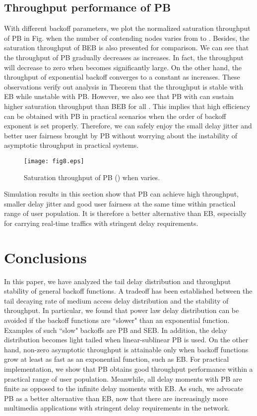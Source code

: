 \documentclass[journal]{IEEEtran}
\begin{document}
\subsection{Throughput performance of PB}
With different backoff parameters, we plot the normalized saturation throughput of PB in Fig.  when the number of contending nodes varies from  to . Besides, the saturation throughput of BEB is also presented for comparison. We can see that the throughput of PB gradually decreases as  increases. In fact, the throughput will decrease to zero when  becomes significantly large. On the other hand, the throughput of exponential backoff converges to a constant as  increases. These observations verify out analysis in Theorem  that the throughput is stable with EB while unstable with PB. However, we also see that PB with  can sustain higher saturation throughput than BEB for all . This implies that high efficiency can be obtained with PB in practical scenarios when the order of backoff exponent is set properly. Therefore, we can safely enjoy the small delay jitter and better user fairness brought by PB without worrying about the instability of asymptotic throughput in practical systems.

\begin{figure}
\centering
  \begin{center}
    \texttt{[image: fig8.eps]}
  \end{center}
  \caption{Saturation throughput of PB () when  varies.}
  \label{58}
\end{figure}

Simulation results in this section show that PB can achieve high throughput, smaller delay jitter and good user fairness at the same time within practical range of user population. It is therefore a better alternative than EB, especially for carrying real-time traffics with stringent delay requirements.

\section{Conclusions}
In this paper, we have analyzed the tail delay distribution and throughput stability of general backoff functions. A tradeoff has been established between the tail decaying rate of medium access delay distribution and the stability of throughput. In particular, we found that power law delay distribution can be avoided if the backoff functions are ``slower" than an exponential function. Examples of such ``slow" backoffs are PB and SEB. In addition, the delay distribution becomes light tailed when linear-sublinear PB is used. On the other hand, non-zero asymptotic throughput is attainable only when backoff functions grow at least as fast as an exponential function, such as EB. For practical implementation, we show that PB obtains good throughput performance within a practical range of user population. Meanwhile, all delay moments with PB are finite as opposed to the infinite delay moments with EB. As such, we advocate PB as a better alternative than EB, now that there are increasingly more multimedia applications with stringent delay requirements in the network.
\end{document}
